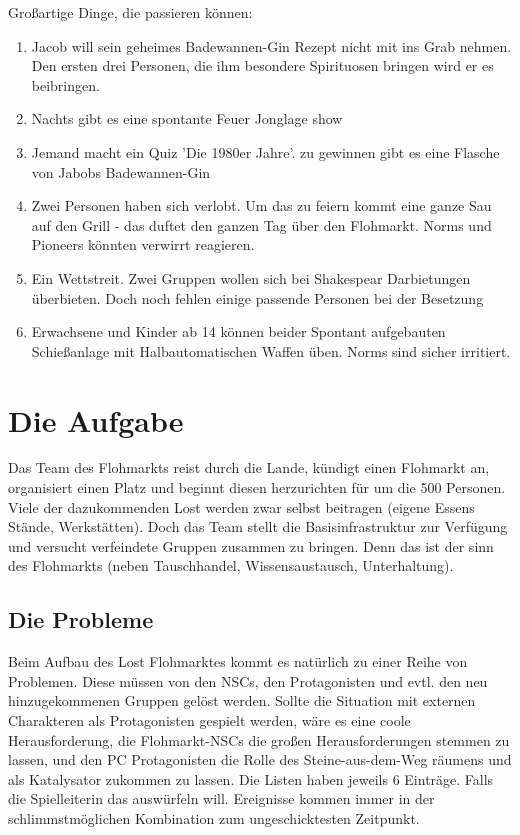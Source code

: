 Großartige Dinge, die passieren können:

\begin{enumerate}
    \item Jacob will sein geheimes Badewannen-Gin Rezept nicht mit ins Grab nehmen. Den ersten drei Personen, die ihm besondere Spirituosen bringen wird er es beibringen.
    \item Nachts gibt es eine spontante Feuer Jonglage show
    \item Jemand macht ein Quiz 'Die 1980er Jahre'. zu gewinnen gibt es eine Flasche von Jabobs Badewannen-Gin
    \item Zwei Personen haben sich verlobt. Um das zu feiern kommt eine ganze Sau auf den Grill - das duftet den ganzen Tag über den Flohmarkt. Norms und Pioneers könnten verwirrt reagieren.
    \item Ein Wettstreit. Zwei Gruppen wollen sich bei Shakespear Darbietungen überbieten. Doch noch fehlen einige passende Personen bei der Besetzung
    \item Erwachsene und Kinder ab 14 können beider Spontant aufgebauten Schießanlage mit Halbautomatischen Waffen üben. Norms sind sicher irritiert.
\end{enumerate}


\chapter{Die Aufgabe}

Das Team des Flohmarkts reist durch die Lande, kündigt einen Flohmarkt an, organisiert einen Platz und beginnt diesen herzurichten für um die 500 Personen. Viele der dazukommenden Lost werden zwar selbst beitragen (eigene Essens Stände, Werkstätten).
Doch das Team stellt die Basisinfrastruktur zur Verfügung und versucht verfeindete Gruppen zusammen zu bringen. Denn das ist der sinn des Flohmarkts (neben Tauschhandel, Wissensaustausch, Unterhaltung).

\section{Die Probleme}

Beim Aufbau des Lost Flohmarktes kommt es natürlich zu einer Reihe von Problemen. Diese müssen von den NSCs, den Protagonisten und evtl. den neu hinzugekommenen Gruppen gelöst werden. Sollte die Situation mit externen Charakteren als Protagonisten gespielt werden, wäre es eine coole Herausforderung, die Flohmarkt-NSCs die großen Herausforderungen stemmen zu lassen, und den PC Protagonisten die Rolle des Steine-aus-dem-Weg räumens und als Katalysator zukommen zu lassen. Die Listen haben jeweils 6 Einträge. Falls die Spielleiterin das auswürfeln will. Ereignisse kommen immer in der schlimmstmöglichen Kombination zum ungeschicktesten Zeitpunkt.

